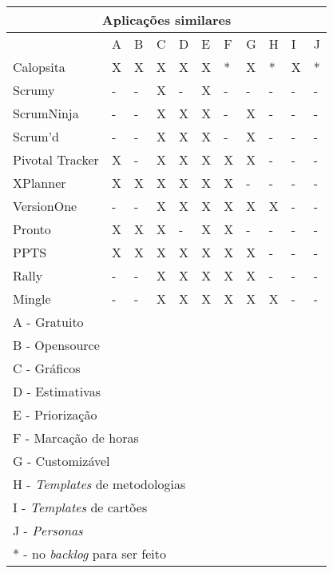 \begin{tabular}{|l|l|l|l|l|l|l|l|l|l|l|}
	\hline
	\multicolumn{11}{|c|}{Aplicações similares} \\
	\hline
	                & A & B & C & D & E & F & G & H & I & J \\
	Calopsita       & X & X & X & X & X & * & X & * & X & * \\
	Scrumy          & - & - & X & - & X & - & - & - & - & - \\
	ScrumNinja      & - & - & X & X & X & - & X & - & - & - \\
	Scrum'd         & - & - & X & X & X & - & X & - & - & - \\
	Pivotal Tracker & X & - & X & X & X & X & X & - & - & - \\
	XPlanner        & X & X & X & X & X & X & - & - & - & - \\
	VersionOne      & - & - & X & X & X & X & X & X & - & - \\
	Pronto          & X & X & X & - & X & X & - & - & - & - \\
	PPTS            & X & X & X & X & X & X & X & - & - & - \\
	Rally           & - & - & X & X & X & X & X & - & - & - \\
	Mingle          & - & - & X & X & X & X & X & X & - & - \\
	\hline
	\multicolumn{11}{l}{A - Gratuito} \\
	\multicolumn{11}{l}{B - Opensource} \\
	\multicolumn{11}{l}{C - Gráficos} \\
	\multicolumn{11}{l}{D - Estimativas} \\
	\multicolumn{11}{l}{E - Priorização} \\
	\multicolumn{11}{l}{F - Marcação de horas} \\
	\multicolumn{11}{l}{G - Customizável} \\
	\multicolumn{11}{l}{H - \textit{Templates} de metodologias} \\
	\multicolumn{11}{l}{I - \textit{Templates} de cartões} \\
	\multicolumn{11}{l}{J - \textit{Personas}} \\
	\multicolumn{11}{l}{* - no \textit{backlog} para ser feito} \\
\end{tabular}
